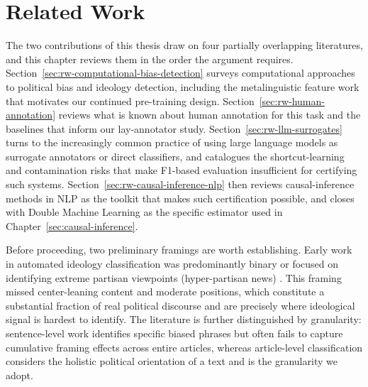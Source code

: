 
\chapter{Related Work}
\label{sec:relatedwork}

The two contributions of this thesis draw on four partially overlapping literatures, and this chapter reviews them in the order the argument requires. Section~\ref{sec:rw-computational-bias-detection} surveys computational approaches to political bias and ideology detection, including the metalinguistic feature work that motivates our continued pre-training design. Section~\ref{sec:rw-human-annotation} reviews what is known about human annotation for this task and the baselines that inform our lay-annotator study. Section~\ref{sec:rw-llm-surrogates} turns to the increasingly common practice of using large language models as surrogate annotators or direct classifiers, and catalogues the shortcut-learning and contamination risks that make F1-based evaluation insufficient for certifying such systems. Section~\ref{sec:rw-causal-inference-nlp} then reviews causal-inference methods in NLP as the toolkit that makes such certification possible, and closes with Double Machine Learning as the specific estimator used in Chapter~\ref{sec:causal-inference}.

Before proceeding, two preliminary framings are worth establishing. Early work in automated ideology classification was predominantly binary or focused on identifying extreme partisan viewpoints (hyper-partisan news) \citep{hube2018detecting, semeval2019hyperpartisan, krieger2022daroberta, lin2024inditag}. This framing missed center-leaning content and moderate positions, which constitute a substantial fraction of real political discourse and are precisely where ideological signal is hardest to identify. The literature is further distinguished by granularity: sentence-level work \citep{spinde2021mbic, spinde2021babe, menzner2025biasscanner} identifies specific biased phrases but often fails to capture cumulative framing effects across entire articles, whereas article-level classification considers the holistic political orientation of a text and is the granularity we adopt.





